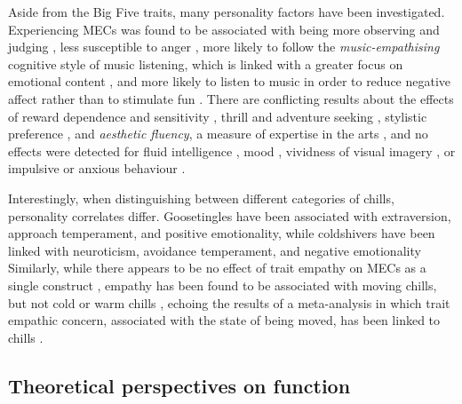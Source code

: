 Aside from the Big Five traits, many personality factors have been investigated. Experiencing MECs was found to be associated with being more observing and judging \parencite{harrison2016}, less susceptible to anger \parencite{laeng2016}, more likely to follow the \emph{music-empathising} cognitive style of music listening, which is linked with a greater focus on emotional content \parencite{linnemann2018}, and more likely to listen to music in order to reduce negative affect rather than to stimulate fun \parencite{starcke2019}. There are conflicting results about the effects of reward dependence and sensitivity \parencites{bannister2020b, grewe2007}[see Section \ref{se:rev-results-5} for the relationship between MECs and anhedonia]{mori2015}, thrill and adventure seeking \parencite{grewe2007, mathis2017}, stylistic preference \parencite{bannister2018, nusbaum2011}, and \emph{aesthetic fluency}, a measure of expertise in the arts \parencite{silvia2011, harrison2016}, and no effects were detected for fluid intelligence \parencite{silvia2011}, mood \parencite{baltes2014}, vividness of visual imagery \parencite{baltes2014}, or impulsive or anxious behaviour \parencite{honda2020}.

Interestingly, when distinguishing between different categories of chills, personality correlates differ. Goosetingles have been associated with extraversion, approach temperament, and positive emotionality, while coldshivers have been linked with neuroticism, avoidance temperament, and negative emotionality \parencite{maruskin2012} Similarly, while there appears to be no effect of trait empathy on MECs as a single construct \parencite{bannister2020b, baltes2014}, empathy has been found to be associated with moving chills, but not cold or warm chills \parencite{bannister2019}, echoing the results of a meta-analysis in which trait empathic concern, associated with the state of being moved, has been linked to chills \parencite{zickfeld2017}.



\subsection{Theoretical perspectives on function}
\label{se:rev-results-8}

